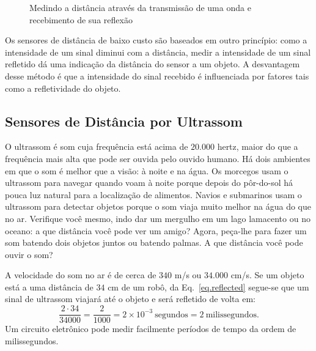 \begin{figure}
\begin{center}
\end{center}
\caption{Medindo a distância através da transmissão de uma onda e recebimento de sua reflexão}\label{fig.measure-d}
\end{figure}

Os sensores de distância de baixo custo são baseados em outro princípio: como a intensidade de um sinal diminui com a distância, medir a intensidade de um sinal refletido dá uma indicação da distância do sensor a um objeto. A desvantagem desse método é que a intensidade do sinal recebido é influenciada por fatores tais como a refletividade do objeto.

\subsection{Sensores de Distância por Ultrassom}

O ultrassom é som cuja frequência está acima de $20.000$ hertz, maior do que a frequência mais alta que pode ser ouvida pelo ouvido humano. Há dois ambientes em que o som é melhor que a visão: à noite e na água. Os morcegos usam o ultrassom para navegar quando voam à noite porque depois do pôr-do-sol há pouca luz natural para a localização de alimentos. Navios e submarinos usam o ultrassom para detectar objetos porque o som viaja muito melhor na água do que no ar. Verifique você mesmo, indo dar um mergulho em um lago lamacento ou no oceano: a que distância você pode ver um amigo? Agora, peça-lhe para fazer um som batendo dois objetos juntos ou batendo palmas. A que distância você pode ouvir o som? 

A velocidade do som no ar é de cerca de $340$ m/s ou $34.000$ cm/s. Se um objeto está a uma distância de $34$ cm de um robô, da Eq.~\ref{eq.reflected} segue-se que um sinal de ultrassom viajará até o objeto e será refletido de volta em:
\[\frac{2\cdot 34}{34000} = \frac{2}{1000} = 2\times 10^{-3}\  \textrm{segundos} = 2\  \textrm{milissegundos}.\]
Um circuito eletrônico pode medir facilmente períodos de tempo da ordem de milissegundos.

